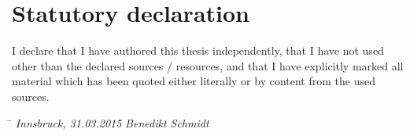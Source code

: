 \chapter*{Statutory declaration}
\thispagestyle{empty}

I declare that I have authored this thesis independently, that I have not used other than the declared sources / resources, and that I have explicitly marked all material which has been quoted either literally or by content from the used sources.

\vspace{3cm}
\begin{tabbing}
	\hspace{6cm}  \= \kill
	\textit{Innsbruck, 31.03.2015} \> \textit{Benedikt Schmidt}
\end{tabbing}